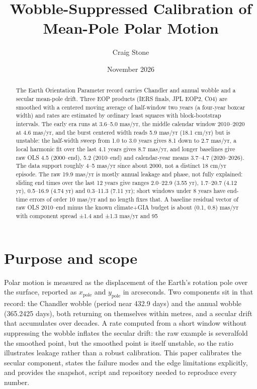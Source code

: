 \documentclass[11pt,a4paper]{article}
\title{Wobble-Suppressed Calibration of Mean-Pole Polar Motion}
\author{Craig Stone}
\date{November 2026}
\begin{document}
\maketitle

\begin{abstract}
The Earth Orientation Parameter record carries Chandler and annual wobble and a secular mean-pole drift. Three EOP products (IERS finals, JPL EOP2, C04) are smoothed with a centered moving average of half-window two years (a four-year boxcar width) and rates are estimated by ordinary least squares with block-bootstrap intervals. The early era runs at 3.6--5.0 mas/yr, the middle calendar window 2010--2020 at 4.6 mas/yr, and the burst centered width reads 5.9 mas/yr (18.1 cm/yr) but is unstable: the half-width sweep from 1.0 to 3.0 years gives 8.1 down to 2.7 mas/yr, a local harmonic fit over the last 4.1 years gives 8.7 mas/yr, and longer baselines give raw OLS 4.5 (2000--end), 5.2 (2010--end) and calendar-year means 3.7--4.7 (2020--2026). The data support roughly 4--5 mas/yr since about 2000, not a distinct 18 cm/yr episode. The raw 19.9 mas/yr is mostly annual leakage and phase, not fully explained: sliding end times over the last 12 years give ranges 2.0--22.9 (3.55 yr), 1.7--20.7 (4.12 yr), 0.5--16.9 (4.74 yr) and 0.3--11.3 (7.11 yr); short windows under 8 years have end-time errors of order 10 mas/yr and no length fixes that. A baseline residual vector of raw OLS 2010--end minus the known climate+GIA budget is about (0.1, 0.8) mas/yr with component spread ±1.4 and ±1.3 mas/yr and 95%
\end{abstract}

\section{Purpose and scope}

Polar motion is measured as the displacement of the Earth's rotation pole over the surface, reported as $x_{\text{pole}}$ and $y_{\text{pole}}$ in arcseconds. Two components sit in that record: the Chandler wobble (period near 432.9 days) and the annual wobble (365.2425 days), both returning on themselves within metres, and a secular drift that accumulates over decades. A rate computed from a short window without suppressing the wobble inflates the secular drift: the raw example is severalfold the smoothed point, but the smoothed point is itself unstable, so the ratio illustrates leakage rather than a robust calibration. This paper calibrates the secular component, states the failure modes and the edge limitations explicitly, and provides the snapshot, script and repository needed to reproduce every number.
\end{document}
